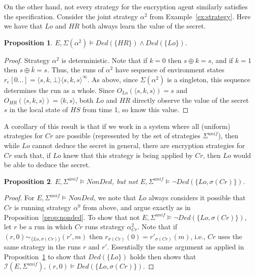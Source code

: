 \documentclass[a4wide]{article}
\newtheorem{propn}{Proposition}
\theoremstyle{examplesty}
\newcommand{\strat}{\sigma}
\newcommand{\I}{\mathcal{I}}
\newcommand{\Env}{E}
\newcommand{\unif}{\mathit{unif}}
\newcommand{\Crypt}{Cr}
\newcommand{\Low}{Lo}
\begin{document}
On the other hand, not every strategy for the encryption agent similarly satisfies the specification. 
Consider the joint strategy $\alpha^2$ from Example~\ref{ex:strategy}.  Here we have 
that $\Low$ and $HR$ both always learn the value of the secret. 

\begin{propn} \label{prop:nonded2}
$\Env, \Sigma(\alpha^2)  \models \mathit{Ded}(\{HR\}) \land \mathit{Ded}(\{\Low\}) $. 
\end{propn} 

\begin{proof} 
Strategy $\alpha^2$ is deterministic. Note that if $k=0$ then $s\oplus k =s$, 
and if $k =1$ then $s\oplus \overline{k} =s$. Thus, the runs of $\alpha^2$ have sequence of environment states 
$r_e[0\ldots ] = \langle s,k,\bot \rangle \langle s,k,s \rangle^\infty$. 
As above, since $\Sigma(\alpha^2) $ is a singleton, this sequence determines the run as a whole. 
Since $O_{\Low}( \langle s,k,s \rangle) = s$ and $O_{HR}( \langle s,k,s \rangle) = \langle k,s\rangle$, 
both $\Low$ and $HR$ directly observe the value of the secret $s$ in the local state of $HS$ from time 1, so know this value. 
\end{proof} 

A corollary of this result is that if we work in a system where all (uniform) strategies for $\Crypt$ are 
possible (represented by the set of strategies $\Sigma^\unif$), then while $\Low$ cannot deduce the secret in general, there are encryption strategies
for $\Crypt$ such that, if $\Low$ knew that this strategy is being applied by $\Crypt$, then $\Low$ would be 
able to deduce the secret. 

\begin{propn} \label{prop:nonded3} 
$\Env, \Sigma^\unif \models  \mathit{NonDed}$, 
but not  $\Env, \Sigma^\unif  \models \neg \mathit{Ded}(\{\Low, \strat(\Crypt)\}) $. 
\end{propn} 

\begin{proof} 
For $\Env, \Sigma^\unif \models  \mathit{NonDed}$, we note that $\Low$ always considers it possible
that $\Crypt$ is running strategy $\alpha^0$ from above, and argue exactly as in Proposition~\ref{prop:nonded}. 
To show that not  $\Env, \Sigma^\unif  \models \neg \mathit{Ded}(\{\Low, \strat(\Crypt)\}) $, 
let  $r$ be a run in which $\Crypt$ runs strategy 
$\alpha^2_{\Crypt}$.  Note that if $(r,0) \sim_{\{\Low, \strat(\Crypt)\}} (r',m)$ then 
$r_{\strat(\Crypt)}(0)= r'_{\strat(\Crypt)}(m)$, i.e.,  $\Crypt$ uses the same strategy in the runs $r$ and $r'$. 
Essentially the same argument as applied in Proposition~\ref{prop:nonded2} 
to show that $\mathit{Ded}(\{\Low\})$ holds then shows that  $\I(\Env, \Sigma^\unif), (r,0) \models  \mathit{Ded}(\{\Low,  \strat(\Crypt)\})$.  
\end{proof} 
\end{document}
